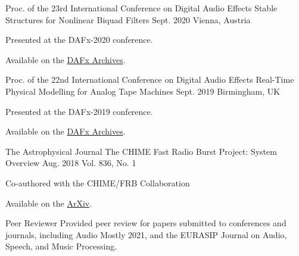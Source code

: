 \begin{cventries}
  \cventry
    {Proc. of the 23rd International Conference on Digital Audio Effects} %
    {Stable Structures for Nonlinear Biquad Filters} %
    {Sept. 2020} %
    {Vienna, Austria} %
    {
      \begin{cvitems} %
        \item {Presented at the DAFx-2020 conference.}
        \item {Available on the \href{https://www.dafx.de/paper-archive/2020/proceedings/papers/DAFx2020_paper_3.pdf}{DAFx Archives}.}
      \end{cvitems}
    }

  \cventry
    {Proc. of the 22nd International Conference on Digital Audio Effects} %
    {Real-Time Physical Modelling for Analog Tape Machines} %
    {Sept. 2019} %
    {Birmingham, UK} %
    {
      \begin{cvitems} %
        \item {Presented at the DAFx-2019 conference.}
        \item {Available on the \href{http://www.dafx.de/paper-archive/2019/DAFx2019_paper_3.pdf}{DAFx Archives}.}
      \end{cvitems}
    }

  \cventry
    {The Astrophysical Journal} %
    {The CHIME Fast Radio Burst Project: System Overview} %
    {Aug. 2018} %
    {Vol. 836, No. 1} %
    {
      \begin{cvitems} %
        \item {Co-authored with the CHIME/FRB Collaboration}
        \item {Available on the \href{https://arxiv.org/abs/1803.11235}{ArXiv}.}
      \end{cvitems}
    }


\end{cventries}

\begin{cvskills}
  \cvskill
    {Peer Reviewer} %
    {Provided peer review for papers submitted to conferences and journals, including
    Audio Mostly 2021, \newline and the EURASIP Journal on Audio, Speech, and Music Processing.}
\end{cvskills}

